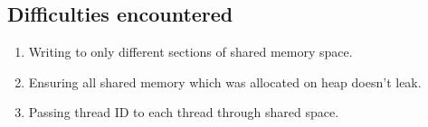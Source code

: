 \documentclass{article}
\begin{document}
\subsection{Difficulties encountered}

\begin{enumerate}
    \item Writing to only different sections of 
    shared memory space.
    \item Ensuring all shared memory which was 
    allocated on heap doesn't leak.
    \item Passing thread ID to each thread 
    through shared space. 
\end{enumerate}

\printbibliography
\end{document}
